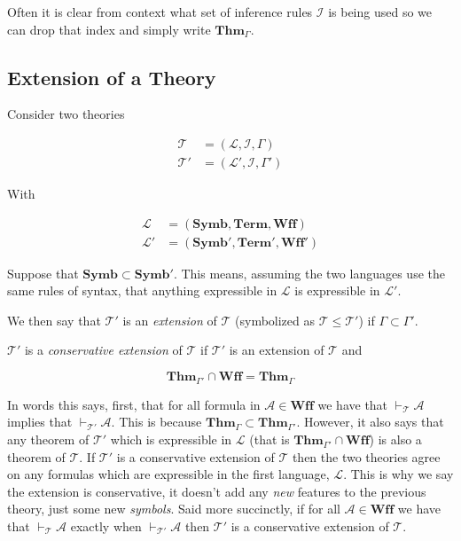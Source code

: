 \documentclass[12pt]{article}
\newcommand{\bv}[1]{\boldsymbol{#1}}
\newcommand{\mc}[1]{\mathcal{#1}}
\newcommand{\bc}[1]{\bv{\mc{#1}}}
\begin{document}
Often it is clear from context what set of inference rules $\bc{I}$ is being used so we can drop that index and simply write $\textbf{Thm}_{\Gamma}$.


\subsection*{Extension of a Theory}

Consider two theories

\begin{equation}
\begin{split}
\bc{T} &= (\bv{\mc{L}},\bc{I},\Gamma)\\
\bc{T}' &= (\bv{\mc{L}}',\bc{I},\Gamma')
\end{split}
\end{equation}

With

\begin{equation}
\begin{split}
\bv{\mc{L}} &= (\textbf{Symb},\textbf{Term},\textbf{Wff})\\
\bv{\mc{L}'} &= (\textbf{Symb}',\textbf{Term}',\textbf{Wff}')
\end{split}
\end{equation}

Suppose that $\textbf{Symb} \subset \textbf{Symb}'$. This means, assuming the two languages use the same rules of syntax, that anything expressible in $\bv{\mc{L}}$ is expressible in $\bv{\mc{L}}'$.

We then say that $\bc{T}'$ is an \textit{extension} of $\bc{T}$ (symbolized as $\bc{T} \le \bc{T}'$) if $\Gamma \subset \Gamma'$. 

$\bc{T}'$ is a \textit{conservative extension} of $\bc{T}$ if $\bc{T}'$ is an extension of $\bc{T}$ and

$$
\textbf{Thm}_{\Gamma'} \cap \textbf{Wff} = \textbf{Thm}_{\Gamma}
$$

In words this says, first, that for all formula in $\mc{A} \in \textbf{Wff}$ we have that $\vdash_{\bc{T}} \mc{A}$ implies that $\vdash_{\bc{T}'} \mc{A}$. This is because $\textbf{Thm}_{\Gamma}\subset \textbf{Thm}_{\Gamma'}$. However, it also says that any theorem of $\bc{T}'$ which is expressible in $\bv{\mc{L}}$ (that is $\textbf{Thm}_{\Gamma'} \cap \textbf{Wff}$) is also a theorem of $\bc{T}$. If $\bc{T}'$ is a conservative extension of $\bc{T}$ then the two theories agree on any formulas which are expressible in the first language, $\bv{\mc{L}}$. This is why we say the extension is conservative, it doesn't add any \textit{new} features to the previous theory, just some new \textit{symbols}. Said more succinctly, if for all $\mc{A} \in \textbf{Wff}$ we have that $\vdash_{\bc{T}} \mc{A}$ exactly when $\vdash_{\bc{T}'} \mc{A}$ then $\bc{T}'$ is a conservative extension of $\bc{T}$.
\end{document}
